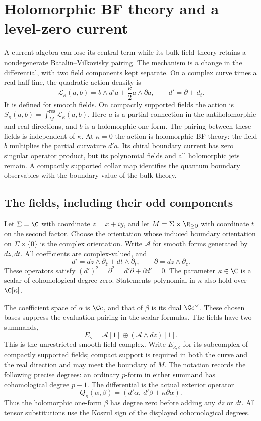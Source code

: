 \chapter{Holomorphic BF theory and a level-zero current}
\label{chap:zero-level-bf}

A current algebra can lose its central term while its bulk field theory
retains a nondegenerate Batalin--Vilkovisky pairing.  The mechanism is a
change in the differential, with two field components kept separate.
On a complex curve times a real half-line, the quadratic action density is
\[
 \mathcal L_\kappa(a,b)
 =b\wedge d'a+\frac\kappa2a\wedge\partial a,
 \qquad d'=\bar\partial+d_t.
\]
It is defined for smooth fields.  On compactly supported fields the
action is $S_\kappa(a,b)=\int_M^{\mathrm{res}}\mathcal L_\kappa(a,b)$.
Here $a$ is a partial connection in the antiholomorphic and real
directions, and $b$ is a holomorphic one-form.  The pairing between
these fields is independent of $\kappa$.  At $\kappa=0$ the action is
holomorphic BF theory: the field $b$ multiplies the partial curvature
$d'a$.  Its chiral boundary current has zero singular
operator product, but its polynomial fields and all holomorphic jets
remain.  A compactly supported collar map identifies the quantum
boundary observables with the boundary value of the bulk theory.

\section{The fields, including their odd components}

Let $\Sigma=\C$ with coordinate $z=x+iy$, and let
$M=\Sigma\times\R_{\ge0}$ with coordinate $t$ on the second factor.
Choose the orientation whose induced boundary orientation on
$\Sigma\times\{0\}$ is the complex orientation.
Write $\mathcal A$ for smooth forms generated by $d\bar z,dt$.
All coefficients are complex-valued, and
\[
 d'=d\bar z\wedge\partial_{\bar z}+dt\wedge\partial_t,
 \qquad \partial=dz\wedge\partial_z.
\]
These operators satisfy $(d')^2=\partial^2=d'\partial+\partial d'=0$.
The parameter $\kappa\in\C$ is a scalar of cohomological degree zero.
Statements polynomial in $\kappa$ also hold over $\C[\kappa]$.

The coefficient space of $\alpha$ is $\C e$, and that of $\beta$ is
its dual $\C e^\vee$.  These chosen bases suppress the evaluation
pairing in the scalar formulas.  The fields have two summands,
\[
 E_\kappa=\mathcal A[1]\oplus(\mathcal A\wedge dz)[1].
\]
This is the unrestricted smooth field complex.  Write $E_{\kappa,c}$
for its subcomplex of compactly supported fields; compact support is
required in both the curve and the real direction and may meet the
boundary of $M$.
The notation records the following precise degrees: an ordinary
$p$-form in either summand has cohomological degree $p-1$.
The differential is the actual exterior operator
\[
 Q_\kappa(\alpha,\beta)
   =(d'\alpha,\ d'\beta+\kappa\partial\alpha).
\]
Thus the holomorphic one-form $\beta$ has degree zero before adding
any $d\bar z$ or $dt$.  All tensor substitutions use the Koszul sign
of the displayed cohomological degrees.

